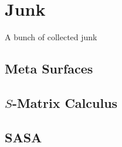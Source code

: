 \section{Junk}
A bunch of collected junk

\subsection{Meta Surfaces} \label{sec:MS}

\newpage

\subsection{$S$-Matrix Calculus}

\newpage

\subsection{SASA}

\newpage
